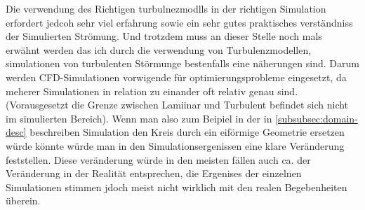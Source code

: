 \begin{refsection}
Die verwendung des Richtigen turbulnezmodlls in der richtigen Simulation erfordert jedcoh sehr viel erfahrung sowie ein sehr gutes praktisches verständniss der Simulierten Strömung.
Und trotzdem muss an dieser Stelle noch mals erwähnt werden das ich durch die verwendung von Turbulenzmodellen, simulationen von turbulenten Störmunge bestenfalls eine näherungen sind.
Darum werden CFD-Simulationen vorwigende für optimierungsprobleme eingesetzt, da meherer Simulationen in relation zu einander oft relativ genau sind.
(Vorausgesetzt die Grenze zwischen Lamiinar und Turbulent befindet sich nicht im simulierten Bereich).
Wenn man also zum Beipiel in der in \ref{subsubsec:domain-desc} beschreiben Simulation den Kreis durch ein eiförmige Geometrie ersetzen würde könnte würde man in den Simulationsergenissen eine klare Veränderung feststellen.
Diese veränderung würde in den meisten fällen auch ca. der Veränderung in der Realität entsprechen, die Ergenises der einzelnen Simulationen stimmen jdoch meist nicht wirklich mit den realen Begebenheiten überein.


% 
% 
% 

\printbibliography[heading=subbibliography]
\end{refsection}
